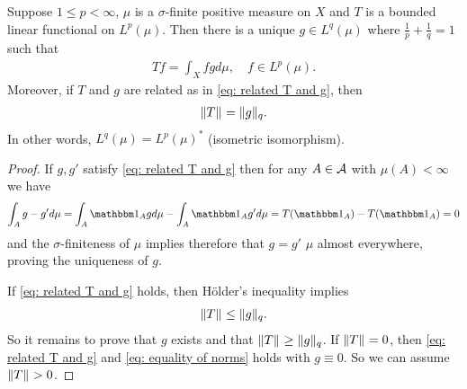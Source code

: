 \begin{theorem}\label{thm: p dual of q}
Suppose $1\le p < \infty$, $\mu$ is a $\sigma$-finite positive measure on $X$ and $T$ is a bounded linear functional on $L^{p}(\mu)$. Then there is a unique $g\in L^{q}(\mu)$ where $\frac{1}{p}+\frac{1}{q}=1$ such that
\begin{align}
	Tf=\int_{X}fgd\mu, \quad f\in L^{p}(\mu). \label{eq: related T and g}
\end{align}
Moreover, if $T$ and $g$ are related as in \eqref{eq: related T and g}, then
\begin{align}
	\norm{T}=\norm[q]{g}. \label{eq: equality of norms}
\end{align}
In other words, $L^{q}(\mu)=L^{p}(\mu)^{*}$ (isometric isomorphism).
\end{theorem}
\begin{proof}
If $g,g'$ satisfy \eqref{eq: related T and g} then for any $A\in \m{A}$ with $\mu(A)<\infty$ we have 
\begin{align*}
	\int_{A}g-g'd\mu=\int_{A}\ind{A}gd\mu-\int_{A}\ind{A}g'd\mu=T(\ind{A})-T(\ind{A})=0
\end{align*}
and the $\sigma$-finiteness of $\mu$ implies therefore that $g=g'$ $\mu$ almost everywhere, proving the uniqueness of $g$.

If \eqref{eq: related T and g} holds, then Hölder's inequality implies
\begin{align*}
	\norm{T}\le \norm[q]{g}.
\end{align*}
So it remains to prove that $g$ exists and that $\norm{T}\ge \norm[q]{g}$. If $\norm{T}=0$, then \eqref{eq: related T and g} and \eqref{eq: equality of norms} holds with $g\equiv 0$. So we can assume $\norm{T}>0$.


\end{proof}
